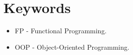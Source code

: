 \documentclass[10pt]{article}
\begin{document}
\section{Keywords}
\label{sec:keywords}
    \begin{itemize}
      \item FP - Functional Programming.
      \item OOP - Object-Oriented Programming.
    \end{itemize}

\clearpage
\nocite{*}
\small{
}
\end{document}
